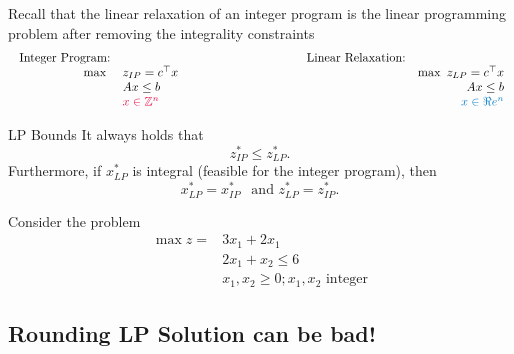 Recall that the linear relaxation of an integer program is the linear programming problem after removing the integrality constraints
$$
\begin{array}{rlclr}
\text{ Integer Program:} & & & \text{Linear Relaxation:}\\
\max \ & z_{IP} = c^\top x & \hspace{3cm} & & \max \  z_{LP} = c^\top x \\
& Ax \leq b & & & Ax \leq b\\
& \tred{x \in \Z^n} & & & \tblue{x \in \R^n}
\end{array}
$$

\begin{theorem}{LP Bounds}{}
It always holds that 
\begin{equation}
z^*_{IP} \leq z^*_{LP}.
\end{equation}
Furthermore, if $x^*_{LP}$ is integral (feasible for the integer program), then 
\begin{equation}
x^*_{LP} = x^*_{IP} \ \ \text{ and } z^*_{LP} = z^*_{IP}.
\end{equation}
\end{theorem}

\begin{example}{}{}

%
\begin{minipage}[t]{0.5\textwidth}
Consider the problem 
\begin{align*}
\max z = & 3x_1 + 2x_1\\
& 2x_1 + x_2 \leq 6\\
& x_1, x_2 \geq 0; x_1, x_2 \text{ integer}
\end{align*}
\end{minipage}
%
\begin{minipage}[t]{0.4\textwidth}
\end{minipage}
\end{example}


  
  
  \subsection{Rounding LP Solution can be bad!}


